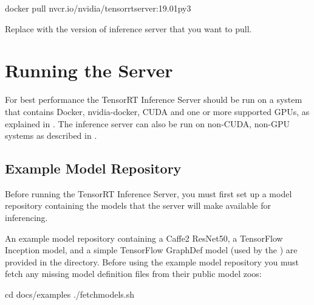 \documentclass[letterpaper,10pt,english]{sphinxmanual}
\begin{document}
\begin{sphinxVerbatim}[commandchars=\\\{\}]
docker pull nvcr.io/nvidia/tensorrtserver:19.01\PYGZhy{}py3
\end{sphinxVerbatim}

Replace  with the version of inference server that you want to
pull.


\chapter{Running the Server}
\label{\detokenize{run:running-the-server}}\label{\detokenize{run::doc}}
For best performance the TensorRT Inference Server should be run on a
system that contains Docker, nvidia-docker, CUDA and one or more
supported GPUs, as explained in
{\hyperref[\detokenize{run:section-running-the-inference-server}]{}}. The inference server can
also be run on non-CUDA, non-GPU systems as described in
{\hyperref[\detokenize{run:section-running-the-inference-server-without-gpu}]{}}.


\section{Example Model Repository}
\label{\detokenize{run:example-model-repository}}\label{\detokenize{run:section-example-model-repository}}
Before running the TensorRT Inference Server, you must first set up a
model repository containing the models that the server will make
available for inferencing.

An example model repository containing a Caffe2 ResNet50, a TensorFlow
Inception model, and a simple TensorFlow GraphDef model (used by the
{\hyperref[\detokenize{client:section-client-api}]{}}) are provided in the
directory. Before using the example model repository you must fetch
any missing model definition files from their public model zoos:

\begin{sphinxVerbatim}[commandchars=\\\{\}]
\PYGZdl{} cd docs/examples
\PYGZdl{} ./fetch\PYGZus{}models.sh
\end{sphinxVerbatim}
\end{document}
